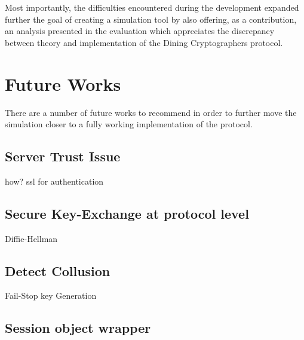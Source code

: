Most importantly, the difficulties encountered during the development expanded further the goal of creating a simulation tool by also offering, as a contribution, an analysis presented in the evaluation which appreciates the discrepancy between theory and implementation of the Dining Cryptographers protocol.



\section{Future Works}
There are a number of future works to recommend in order to further move the simulation closer to a fully working implementation of the protocol.


\subsection{Server Trust Issue}
how? ssl for authentication

\subsection{Secure Key-Exchange at protocol level}
Diffie-Hellman

\subsection{Detect Collusion}
Fail-Stop key Generation

\subsection{Session object wrapper}